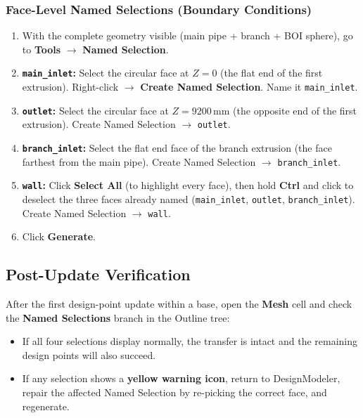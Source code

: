 \documentclass[12pt,a4paper]{report}
\begin{document}
\subsubsection{Face-Level Named Selections (Boundary Conditions)}

\begin{enumerate}
  \item With the complete geometry visible (main pipe + branch + BOI
        sphere), go to \textbf{Tools} $\rightarrow$
        \textbf{Named Selection}.
  \item \textbf{\texttt{main\_inlet}:} Select the circular face at
        $Z = 0$ (the flat end of the first extrusion).  Right-click
        $\rightarrow$ \textbf{Create Named Selection}.  Name it
        \texttt{main\_inlet}.
  \item \textbf{\texttt{outlet}:} Select the circular face at
        $Z = 9200$\,mm (the opposite end of the first extrusion).
        Create Named Selection $\rightarrow$ \texttt{outlet}.
  \item \textbf{\texttt{branch\_inlet}:} Select the flat end face of
        the branch extrusion (the face farthest from the main pipe).
        Create Named Selection $\rightarrow$ \texttt{branch\_inlet}.
  \item \textbf{\texttt{wall}:} Click \textbf{Select All} (to highlight
        every face), then hold \textbf{Ctrl} and click to deselect the
        three faces already named (\texttt{main\_inlet},
        \texttt{outlet}, \texttt{branch\_inlet}).  Create Named
        Selection $\rightarrow$ \texttt{wall}.
  \item Click \textbf{Generate}.
\end{enumerate}

\subsection{Post-Update Verification}

After the first design-point update within a base, open the
\textbf{Mesh} cell and check the \textbf{Named Selections} branch
in the Outline tree:

\begin{itemize}
  \item If all four selections display normally, the transfer is
        intact and the remaining design points will also succeed.
  \item If any selection shows a \textbf{yellow warning icon},
        return to DesignModeler, repair the affected Named Selection
        by re-picking the correct face, and regenerate.
\end{itemize}
\end{document}
